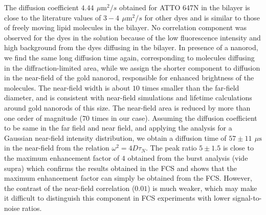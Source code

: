 \documentclass[journal=jacsat,manuscript=article]{achemso}
\newcommand{\um}{\ensuremath{\,\mu\textrm{m}}}
\newcommand{\us}{\ensuremath{\,\mu\textrm{s}}}
\begin{document}
The diffusion coefficient $4.44~\um^2/s$ obtained for ATTO 647N in the bilayer is close to the literature values of $3-4~\um^2/s$\cite{mach2010lipid} for other dyes and is similar to those of freely moving lipid molecules in the bilayer. No correlation component was observed for the dyes in the solution because of the low fluorescence intensity and high background from the dyes diffusing in the bilayer. In presence of a nanorod, we find the same long diffusion time again, corresponding to molecules diffusing in the diffraction-limited area, while we assign the shorter component to diffusion in the near-field of the gold nanorod, responsible for enhanced brightness of the molecules. The near-field width is about $10$ times smaller than the far-field diameter, and is consistent with near-field simulations and lifetime calculations around gold nanorods of this size.\cite{khatua2014resonant,seelig2007nanoparticleinduced} The near-field area is reduced by more than one order of magnitude ($70$ times in our case). Assuming the diffusion coefficient to be same in the far field and near field, and applying the analysis for a Gaussian near-field intensity distribution, we obtain a diffusion time of $57\pm11~\us$ in the near-field from the relation $\omega^2=4D\tau_N$. The peak ratio $5\pm1.5$ is close to the maximum enhancement factor of $4$ obtained from the burst analysis (vide supra) which confirms the results obtained in the FCS and shows that the maximum enhancement factor can simply be obtained from the FCS. However, the contrast of the near-field correlation ($0.01$) is much weaker, which may make it difficult to distinguish this component in FCS experiments with lower signal-to-noise ratios.\\
\end{document}
